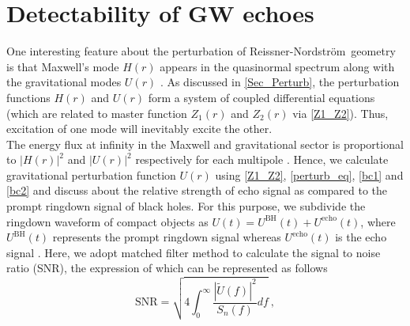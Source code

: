 \documentclass[aps,prd,twocolumn,floatfix,noshowpacs,tightenlines,noshowkeys,superscriptaddress,amsmath,amssymb,
nofootinbib]{revtex4-1}
\renewcommand\[{\begin{equation}}
\renewcommand\]{\end{equation}}
\def\RN{Reissner-Nordstr\"{o}m}
\begin{document}
\section{Detectability of GW echoes}\label{Detect}

One interesting feature about the perturbation of \RN\ geometry is that Maxwell's mode  $H(r)$ appears in the quasinormal spectrum along with the gravitational modes $U(r)$ \cite{Moncrief:1975sb, PhysRevD.9.860,Chand}. As discussed in \autoref{Sec_Perturb}, the perturbation functions $H(r)$ and $U(r)$ form a system of coupled differential equations (which are related to master function $Z_1(r)$ and $Z_2(r)$ via \autoref{Z1_Z2}). Thus, excitation of one mode will inevitably excite the other. \\
The energy flux at infinity in the Maxwell and gravitational sector is proportional to $|H(r)|^2$ and $|U(r)|^2$ respectively for each multipole \cite{Cardoso:2016olt}. Hence, we calculate gravitational perturbation function $U(r)$ using \autoref{Z1_Z2}, \autoref{perturb_eq}, \autoref{bc1} and \autoref{bc2} and  discuss about the relative strength of echo signal as compared to the prompt ringdown signal of black holes. 
For this purpose, we subdivide the ringdown waveform of compact objects as $U(t)=U^{\textrm{BH}}(t)+U^{\textrm{echo}}(t)$, where $U^{\textrm{BH}}(t)$ represents the prompt ringdown signal whereas $U^{\textrm{echo}}(t)$ is the echo signal \cite{Wang:2018mlp}. Here, we adopt matched filter method to calculate the signal to noise ratio (SNR), the expression of which can be represented as follows \cite{Allen:2005fk,TheLIGOScientific:2016qqj,PhysRevD.98.044018}
\begin{equation}\label{SNR}
\textrm{SNR}=\sqrt{4\int_{0}^{\infty}\frac{|\tilde{U}(f)|^2}{S_n(f)}df}~,
\end{equation}
\end{document}
